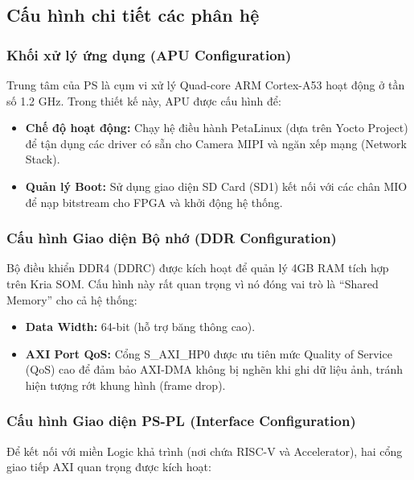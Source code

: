 \subsection{Cấu hình chi tiết các phân hệ}

\subsubsection{Khối xử lý ứng dụng (APU Configuration)}
Trung tâm của PS là cụm vi xử lý Quad-core ARM Cortex-A53 hoạt động ở tần số 1.2 GHz. Trong thiết kế này, APU được cấu hình để:
\begin{itemize}
    \item \textbf{Chế độ hoạt động:} Chạy hệ điều hành PetaLinux (dựa trên Yocto Project) để tận dụng các driver có sẵn cho Camera MIPI và ngăn xếp mạng (Network Stack).
    \item \textbf{Quản lý Boot:} Sử dụng giao diện SD Card (SD1) kết nối với các chân MIO để nạp bitstream cho FPGA và khởi động hệ thống.
\end{itemize}

\subsubsection{Cấu hình Giao diện Bộ nhớ (DDR Configuration)}
Bộ điều khiển DDR4 (DDRC) được kích hoạt để quản lý 4GB RAM tích hợp trên Kria SOM. Cấu hình này rất quan trọng vì nó đóng vai trò là ``Shared Memory'' cho cả hệ thống:
\begin{itemize}
    \item \textbf{Data Width:} 64-bit (hỗ trợ băng thông cao).
    \item \textbf{AXI Port QoS:} Cổng S\_AXI\_HP0 được ưu tiên mức Quality of Service (QoS) cao để đảm bảo AXI-DMA không bị nghẽn khi ghi dữ liệu ảnh, tránh hiện tượng rớt khung hình (frame drop).
\end{itemize}

\subsubsection{Cấu hình Giao diện PS-PL (Interface Configuration)}
Để kết nối với miền Logic khả trình (nơi chứa RISC-V và Accelerator), hai cổng giao tiếp AXI quan trọng được kích hoạt:

